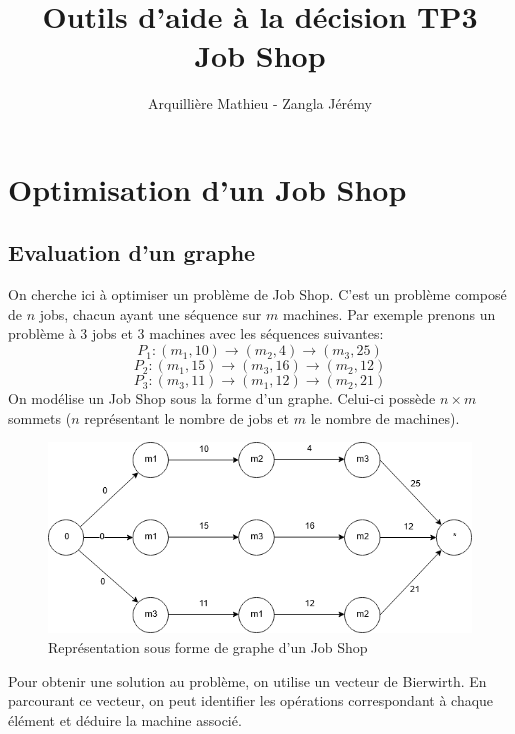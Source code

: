 \documentclass{article}
\title{Outils d'aide à la décision TP3\\Job Shop}
\author{Arquillière Mathieu - Zangla Jérémy}
\date{}
\begin{document}
\begin{titlepage}
  \maketitle
\end{titlepage}

\tableofcontents
\newpage
\listoffigures
\listofalgorithms
\newpage

\section{Optimisation d'un Job Shop}

\subsection{Evaluation d'un graphe}
On cherche ici à optimiser un problème de Job Shop.
C'est un problème composé de $n$ jobs, chacun ayant une séquence
sur $m$ machines. Par exemple prenons un problème à 3 jobs et 3 machines
avec les séquences suivantes:
$$
P_1 : (m_1, 10) \rightarrow (m_2, 4) \rightarrow (m_3, 25)
$$
$$
P_2 : (m_1, 15) \rightarrow (m_3, 16) \rightarrow (m_2, 12)
$$
$$
P_3 : (m_3, 11) \rightarrow (m_1, 12) \rightarrow (m_2, 21)
$$
On modélise un Job Shop sous la forme d'un graphe. Celui-ci possède
$n \times m$ sommets ($n$ représentant le nombre de jobs et $m$
le nombre de machines).

\begin{figure}[!ht]
  \caption{Représentation sous forme de graphe d'un Job Shop}
  \label{Graphe exemple}
  \centering
  \includegraphics[scale=0.5]{images/OAD_grapheJS.png}
\end{figure}

Pour obtenir une solution au problème, on
utilise un vecteur de Bierwirth. En parcourant ce vecteur, on
peut identifier les opérations correspondant à chaque élément
et déduire la machine associé.
\end{document}
